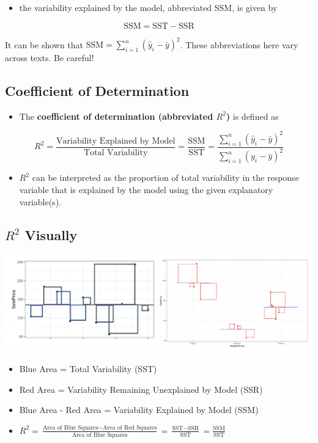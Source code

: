 \documentclass[]{book}
\providecommand{\tightlist}{%
  \setlength{\itemsep}{0pt}\setlength{\parskip}{0pt}}
\begin{document}
\begin{itemize}
\tightlist
\item
  the variability explained by the model, abbreviated SSM, is given by
\end{itemize}

\[ \text{SSM} = \text{SST} - \text{SSR} \]

It can be shown that
\(\text{SSM}=\displaystyle\sum_{i=1}^n(\hat{y}_i-\bar{y})^2\). These
abbreviations here vary across texts. Be careful!

\subsection{Coefficient of
Determination}\label{coefficient-of-determination}

\begin{itemize}
\tightlist
\item
  The \textbf{coefficient of determination (abbreviated \(R^2\))} is
  defined as
\end{itemize}

\[R^2=\frac{\text{Variability Explained by Model}}{\text{Total Variability}}=\frac{\text{SSM}}{\text{SST}} =\frac{\displaystyle\sum_{i=1}^n(\hat{y}_i-\bar{y})^2}{\displaystyle\sum_{i=1}^n(y_i-\bar{y})^2}\]

\begin{itemize}
\tightlist
\item
  \(R^2\) can be interpreted as the proportion of total variability in
  the response variable that is explained by the model using the given
  explanatory variable(s).
\end{itemize}

\subsection{\texorpdfstring{\(R^2\)
Visually}{R\^{}2 Visually}}\label{r2-visually}

\includegraphics[width=1\linewidth]{Rsq2}

\begin{itemize}
\item
  Blue Area = Total Variability (SST)
\item
  Red Area = Variability Remaining Unexplained by Model (SSR)
\item
  Blue Area - Red Area = Variability Explained by Model (SSM)
\item
  \(R^2 = \frac{\text{Area of Blue Squares} - \text{Area of Red Squares}}{\text{Area of Blue Squares}} = \frac{\text{SST}-\text{SSR}}{\text{SST}}= \frac{\text{SSM}}{\text{SST}}\)
\end{itemize}
\end{document}
